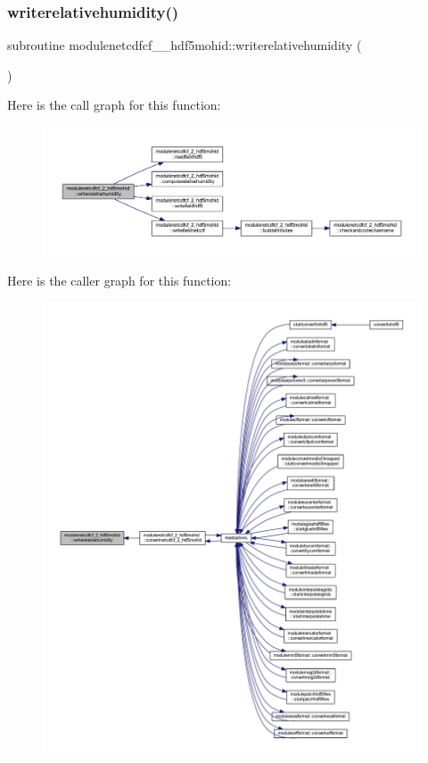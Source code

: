 \subsubsection{\texorpdfstring{writerelativehumidity()}{writerelativehumidity()}}
{\footnotesize\ttfamily subroutine modulenetcdfcf\+\_\+\_\+hdf5mohid\+::writerelativehumidity (\begin{DoxyParamCaption}{ }\end{DoxyParamCaption})\hspace{0.3cm}{\ttfamily [private]}}

Here is the call graph for this function\+:\nopagebreak
\begin{figure}[H]
\begin{center}
\leavevmode
\includegraphics[width=350pt]{namespacemodulenetcdfcf__2__hdf5mohid_a2137023763cf82253ee1d5e868541499_cgraph}
\end{center}
\end{figure}
Here is the caller graph for this function\+:\nopagebreak
\begin{figure}[H]
\begin{center}
\leavevmode
\includegraphics[width=350pt]{namespacemodulenetcdfcf__2__hdf5mohid_a2137023763cf82253ee1d5e868541499_icgraph}
\end{center}
\end{figure}
